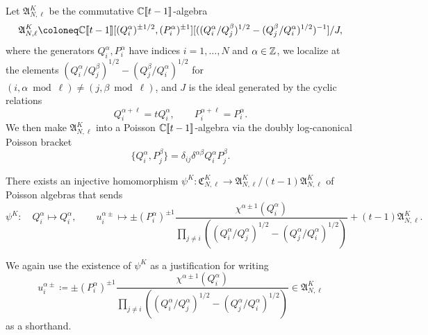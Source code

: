 \begin{definition}\label{def:hypDiffOps}
    Let $\mathfrak{A}_{N,\ell}^K$ be the commutative $\mathbb{C}\llbracket t-1 \rrbracket$-algebra
    \begin{equation}
        \mathfrak{A}_{N,\ell}^K \coloneq \C\llbracket t-1 \rrbracket[(Q_i^\alpha)^{\pm 1/2},(P_i^\alpha)^{\pm 1}][((Q_i^\alpha/Q_j^\beta)^{1/2}-(Q_j^\beta/Q_i^\alpha)^{1/2})^{-1}]/J,
    \end{equation}
    where the generators $Q_i^\alpha,P_i^\alpha$ have indices $i=1,\dots,N$ and $\alpha \in \mathbb{Z}$, we localize at the elements $(Q_i^\alpha/Q_j^\beta)^{1/2}-(Q_j^\beta/Q_i^\alpha)^{1/2}$ for $(i,\alpha \bmod \ell) \neq (j,\beta \bmod \ell)$, and $J$ is the ideal generated by the cyclic relations
    \begin{equation}
        Q_i^{\alpha+\ell} = t Q_i^\alpha, \qquad P_i^{\alpha+\ell} = P_i^\alpha.
    \end{equation}
    We then make $\mathfrak{A}_{N,\ell}^K$ into a Poisson $\mathbb{C}\llbracket t-1 \rrbracket$-algebra via the doubly log-canonical Poisson bracket
    \begin{equation}
        \{ Q_i^\alpha,P_j^\beta \} = \delta_{ij} \delta^{\alpha\beta} Q_i^\alpha P_j^\beta.
    \end{equation}
\end{definition}

\begin{prop}
There exists an injective homomorphism $\psi^K\colon \mathfrak{C}_{N,\ell}^K \to \mathfrak{A}_{N,\ell}^K/(t-1)\mathfrak{A}_{N,\ell}^K$ of Poisson algebras that sends
    \begin{equation}
        \psi^K\colon \quad Q_i^\alpha \mapsto Q_i^\alpha, \qquad u_i^{\alpha\pm} \mapsto \pm (P_i^\alpha)^{\pm 1} \frac{\chi^{\alpha \pm 1}(Q_i^\alpha)}{\prod_{j \neq i} ((Q_i^\alpha/Q_j^\alpha)^{1/2}-(Q_j^\alpha/Q_i^\alpha)^{1/2})} + (t-1) \mathfrak{A}_{N,\ell}^K.
    \end{equation}
\end{prop}

\begin{remark}
    We again use the existence of $\psi^K$ as a justification for writing
    \begin{equation}
        u_i^{\alpha\pm} \coloneq \pm (P_i^\alpha)^{\pm 1} \frac{\chi^{\alpha \pm 1}(Q_i^\alpha)}{\prod_{j \neq i} ((Q_i^\alpha/Q_j^\alpha)^{1/2}-(Q_j^\alpha/Q_i^\alpha)^{1/2})} \in \mathfrak{A}_{N,\ell}^K
    \end{equation}
    as a shorthand.
\end{remark}

